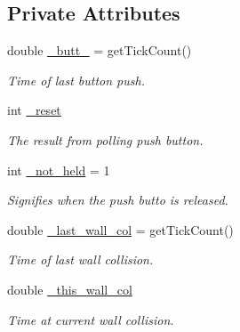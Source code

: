 \subsection*{Private Attributes}
\begin{DoxyCompactItemize}
\item 
\hypertarget{class_c_pong_a5b2e9682dfd61d7d7ce959de4a6123aa}{}\label{class_c_pong_a5b2e9682dfd61d7d7ce959de4a6123aa} 
double \hyperlink{class_c_pong_a5b2e9682dfd61d7d7ce959de4a6123aa}{\+\_\+butt\+\_} = get\+Tick\+Count()
\begin{DoxyCompactList}\small\item\em Time of last button push. \end{DoxyCompactList}\item 
\hypertarget{class_c_pong_ad08209936dbb5c935a6a96e032e0b81b}{}\label{class_c_pong_ad08209936dbb5c935a6a96e032e0b81b} 
int \hyperlink{class_c_pong_ad08209936dbb5c935a6a96e032e0b81b}{\+\_\+reset}
\begin{DoxyCompactList}\small\item\em The result from polling push button. \end{DoxyCompactList}\item 
\hypertarget{class_c_pong_ad9ff59f2dbff06b2813e960eb3f48bd2}{}\label{class_c_pong_ad9ff59f2dbff06b2813e960eb3f48bd2} 
int \hyperlink{class_c_pong_ad9ff59f2dbff06b2813e960eb3f48bd2}{\+\_\+not\+\_\+held} = 1
\begin{DoxyCompactList}\small\item\em Signifies when the push butto is released. \end{DoxyCompactList}\item 
\hypertarget{class_c_pong_a77a4e90c7d592236d36fa35d31b00c54}{}\label{class_c_pong_a77a4e90c7d592236d36fa35d31b00c54} 
double \hyperlink{class_c_pong_a77a4e90c7d592236d36fa35d31b00c54}{\+\_\+last\+\_\+wall\+\_\+col} = get\+Tick\+Count()
\begin{DoxyCompactList}\small\item\em Time of last wall collision. \end{DoxyCompactList}\item 
\hypertarget{class_c_pong_ad628f966b059637b9ac93f9ba405eaec}{}\label{class_c_pong_ad628f966b059637b9ac93f9ba405eaec} 
double \hyperlink{class_c_pong_ad628f966b059637b9ac93f9ba405eaec}{\+\_\+this\+\_\+wall\+\_\+col}
\begin{DoxyCompactList}\small\item\em Time at current wall collision. \end{DoxyCompactList}\item 

\end{DoxyCompactItemize}
